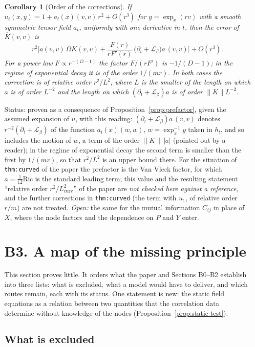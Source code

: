 \documentclass[a4paper,11pt]{article}
\newtheorem{corollary}[theorem]{Corollary}
\theoremstyle{definition}
\theoremstyle{remark}
\newcommand{\Lie}{\mathcal{L}}
\newcommand{\status}[1]{\par\noindent\textsf{\small Status: #1}\par}
\begin{document}
\begin{corollary}[Order of the corrections]\label{cor:prefactor}
If $u_t(x,y)=1+a_t(x)(v,v)\,r^2+O(r^3)$ for $y=\exp_x(rv)$ with a smooth symmetric tensor field $a_t$, uniformly with one derivative in $t$, then the error of $\hat K(v,v)$ is
\[
r^2\Big[a(v,v)\,\Omega K(v,v)+\frac{F(r)}{rF'(r)}\,\big(\partial_t+\Lie_\beta\big)a\,(v,v)\Big]+O(r^3) .
\]
For a power law $F\propto r^{-(D-1)}$ the factor $F/(rF')$ is $-1/(D-1)$; in the regime of exponential decay it is of the order $1/(mr)$. In both cases the correction is of relative order $r^2/L^2$, where $L$ is the smaller of the length on which $a$ is of order $L^{-2}$ and the length on which $(\partial_t+\Lie_\beta)a$ is of order $\|K\|L^{-2}$.
\end{corollary}
\status{proven as a consequence of Proposition~\ref{prop:prefactor}, given the assumed expansion of $u$, with this reading: $(\partial_t+\Lie_\beta)a\,(v,v)$ denotes $r^{-2}(\partial_t+\Lie_\beta)$ of the function $a_t(x)(w,w)$, $w=\exp_x^{-1}y$ taken in $h_t$, and so includes the motion of $w$, a term of the order $\|K\|\,|a|$ (pointed out by a reader); in the regime of exponential decay the second term is smaller than the first by $1/(mr)$, so that $r^2/L^2$ is an upper bound there. For the situation of \texttt{thm:curved} of the paper the prefactor is the Van Vleck factor, for which $a=\tfrac1{12}\mathrm{Ric}$ is the standard leading term; this value and the resulting statement ``relative order $r^2/L_{\mathrm{curv}}^2$'' of the paper are \emph{not checked here against a reference}, and the further corrections in \texttt{thm:curved} (the term with $u_1$, of relative order $r/m$) are not treated. \emph{Open:} the same for the mutual information $C_{ij}$ in place of $X$, where the node factors and the dependence on $P$ and $Y$ enter.}

\section{B3. A map of the missing principle}

This section proves little. It orders what the paper and Sections B0--B2 establish into three lists: what is excluded, what a model would have to deliver, and which routes remain, each with its status. One statement is new: the static field equations as a relation between two quantities that the correlation data determine without knowledge of the nodes (Proposition~\ref{prop:static-test}).

\subsection{What is excluded}
\end{document}
